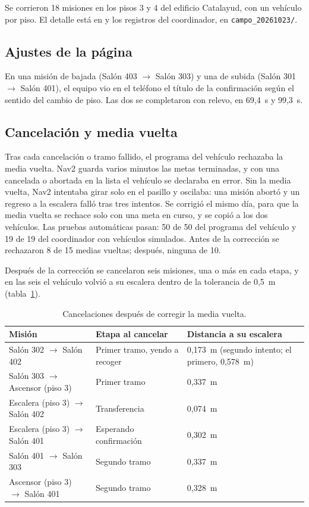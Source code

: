 \documentclass[12pt,letterpaper]{article}
\begin{document}
Se corrieron 18 misiones en los pisos 3 y 4 del edificio Catalayud, con un vehículo por piso. El detalle está en \cite{pruebas} y los registros del coordinador, en \texttt{campo\_20261023/}.

\subsection{Ajustes de la página}

En una misión de bajada (Salón 403 $\rightarrow$ Salón 303) y una de subida (Salón 301 $\rightarrow$ Salón 401), el equipo vio en el teléfono el título de la confirmación según el sentido del cambio de piso. Las dos se completaron con relevo, en 69,4~s y 99,3~s.

\subsection{Cancelación y media vuelta}

Tras cada cancelación o tramo fallido, el programa del vehículo rechazaba la media vuelta. Nav2 guarda varios minutos las metas terminadas, y con una cancelada o abortada en la lista el vehículo se declaraba en error. Sin la media vuelta, Nav2 intentaba girar solo en el pasillo y oscilaba: una misión abortó y un regreso a la escalera falló tras tres intentos. Se corrigió el mismo día, para que la media vuelta se rechace solo con una meta en curso, y se copió a los dos vehículos. Las pruebas automáticas pasan: 50 de 50 del programa del vehículo y 19 de 19 del coordinador con vehículos simulados. Antes de la corrección se rechazaron 8 de 15 medias vueltas; después, ninguna de 10.

Después de la corrección se cancelaron seis misiones, una o más en cada etapa, y en las seis el vehículo volvió a su escalera dentro de la tolerancia de 0,5~m (tabla~\ref{tab:cancelaciones}).

\begin{table}[H]
\centering
\small
\caption{Cancelaciones después de corregir la media vuelta.}
\label{tab:cancelaciones}
\begin{tabular}{@{}p{5.2cm}p{4.6cm}p{5.6cm}@{}}
\toprule
\textbf{Misión} & \textbf{Etapa al cancelar} & \textbf{Distancia a su escalera} \\ \midrule
Salón 302 $\rightarrow$ Salón 402 & Primer tramo, yendo a recoger & 0,173~m (segundo intento; el primero, 0,578~m) \\
Salón 303 $\rightarrow$ Ascensor (piso 3) & Primer tramo & 0,337~m \\
Escalera (piso 3) $\rightarrow$ Salón 402 & Transferencia & 0,074~m \\
Escalera (piso 3) $\rightarrow$ Salón 401 & Esperando confirmación & 0,302~m \\
Salón 401 $\rightarrow$ Salón 303 & Segundo tramo & 0,337~m \\
Ascensor (piso 3) $\rightarrow$ Salón 401 & Segundo tramo & 0,328~m \\ \bottomrule
\end{tabular}
\end{table}
\end{document}
